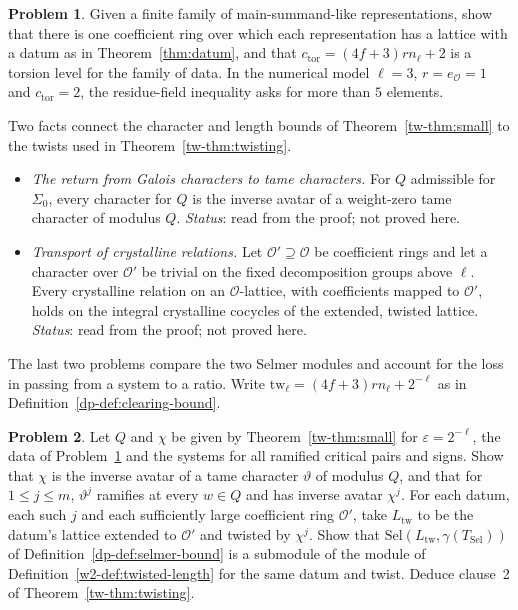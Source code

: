 \documentclass[reqno]{amsart}
\theoremstyle{definition}
\newtheorem{problem}{Problem}[section]
\theoremstyle{plain}
\theoremstyle{remark}
\newcommand{\Oc}{\mathcal O}
\newcommand{\TS}{T_{\mathrm{Sel}}}
\begin{document}
\begin{problem}\label{pr:torsion}
Given a finite family of main-summand-like representations, show that there is one coefficient ring over which each representation has a lattice with a datum as in Theorem~\ref{thm:datum}, and that \(c_{\mathrm{tor}}=(4f+3)rn_\ell+2\) is a torsion level for the family of data.  In the numerical model \(\ell=3\), \(r=e_{\Oc}=1\) and \(c_{\mathrm{tor}}=2\), the residue-field inequality asks for more than \(5\) elements.
\end{problem}

Two facts connect the character and length bounds of Theorem~\ref{tw-thm:small} to the twists used in Theorem~\ref{tw-thm:twisting}.

\begin{itemize}
\item \emph{The return from Galois characters to tame characters.}  For \(Q\) admissible for \(\Sigma_0\), every character for \(Q\) is the inverse avatar of a weight-zero tame character of modulus \(Q\).  \emph{Status}: read from the proof; not proved here.
\item \emph{Transport of crystalline relations.}  Let \(\Oc'\supseteq\Oc\) be coefficient rings and let a character over \(\Oc'\) be trivial on the fixed decomposition groups above \(\ell\).  Every crystalline relation on an \(\Oc\)-lattice, with coefficients mapped to \(\Oc'\), holds on the integral crystalline cocycles of the extended, twisted lattice.  \emph{Status}: read from the proof; not proved here.
\end{itemize}

The last two problems compare the two Selmer modules and account for the loss in passing from a system to a ratio.  Write \(\mathrm{tw}_\ell=(4f+3)rn_\ell+2^{-\ell}\) as in Definition~\ref{dp-def:clearing-bound}.

\begin{problem}\label{pr:assemble}
Let \(Q\) and \(\chi\) be given by Theorem~\ref{tw-thm:small} for \(\varepsilon=2^{-\ell}\), the data of Problem~\ref{pr:torsion} and the systems for all ramified critical pairs and signs.  Show that \(\chi\) is the inverse avatar of a tame character \(\vartheta\) of modulus \(Q\), and that for \(1\le j\le m\), \(\vartheta^j\) ramifies at every \(w\in Q\) and has inverse avatar \(\chi^j\).  For each datum, each such \(j\) and each sufficiently large coefficient ring \(\Oc'\), take \(L_{\mathrm{tw}}\) to be the datum's lattice extended to \(\Oc'\) and twisted by \(\chi^j\).  Show that \(\mathrm{Sel}(L_{\mathrm{tw}},\gamma(\TS))\) of Definition~\ref{dp-def:selmer-bound} is a submodule of the module of Definition~\ref{w2-def:twisted-length} for the same datum and twist.  Deduce clause~2 of Theorem~\ref{tw-thm:twisting}.
\end{problem}
\end{document}
